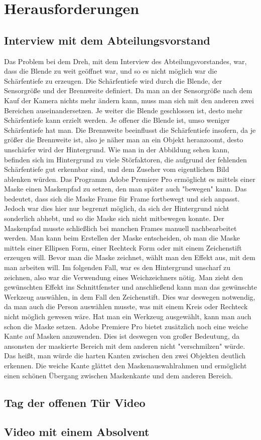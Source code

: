 \section{Herausforderungen}
\subsection{Interview mit dem Abteilungsvorstand}
Das Problem bei dem Dreh, mit dem Interview des Abteilungsvorstandes, war, dass die Blende zu weit geöffnet war, und so es nicht möglich war die Schärfentiefe zu erzeugen. Die Schärfentiefe wird durch die Blende, der Sensorgröße und der Brennweite definiert. Da man an der Sensorgröße nach dem Kauf der Kamera nichts mehr ändern kann, muss man sich mit den anderen zwei Bereichen auseinandersetzen. Je weiter die Blende geschlossen ist, desto mehr Schärfentiefe kann erzielt werden. Je offener die Blende ist, umso weniger Schärfentiefe hat man. Die Brennweite beeinflusst die Schärfentiefe insofern, da je größer die Brennweite ist, also je näher man an ein Objekt heranzoomt, desto unschärfer wird der Hintergrund. 
Wie man in der Abbildung sehen kann, befinden sich im Hintergrund zu viele Störfaktoren, die aufgrund der fehlenden Schärfentiefe gut erkennbar sind, und dem Zuseher vom eigentlichen Bild ablenken würden. 
Das Programm Adobe Premiere Pro ermöglicht es mittels einer Maske einen Maskenpfad zu setzen, den man später auch "bewegen" kann. Das bedeutet, dass sich die Maske Frame für Frame fortbewegt und sich anpasst. Jedoch war dies hier nur begrenzt möglich, da sich der Hintergrund nicht sonderlich abhebt, und so die Maske sich nicht mitbewegen konnte. Der Maskenpfad musste schließlich bei manchen Frames manuell nachbearbeitet werden.
Man kann beim Erstellen der Maske entscheiden, ob man die Maske mittels einer Ellipsen Form, einer Rechteck Form oder mit einem Zeichenstift erzeugen will. Bevor man die Maske zeichnet, wählt man den Effekt aus, mit dem man arbeiten will. Im folgenden Fall, war es den Hintergrund unscharf zu zeichnen, also war die Verwendung eines Weichzeichners nötig. Man zieht den gewünschten Effekt ins Schnittfenster und anschließend kann man das gewünschte Werkzeug auswählen, in dem Fall den Zeichenstift. Dies war deswegen notwendig, da man auch die Person auswählen musste, was mit einem Kreis oder Rechteck nicht möglich gewesen wäre. Hat man ein Werkzeug ausgewählt, kann man auch schon die Maske setzen. Adobe Premiere Pro bietet zusätzlich noch eine weiche Kante auf Masken anzuwenden. Dies ist deswegen von großer Bedeutung, da ansonsten der maskierte Bereich mit dem anderen nicht "verschmilzen" würde. Das heißt, man würde die harten Kanten zwischen den zwei Objekten deutlich erkennen. Die weiche Kante glättet den Maskenauswahlrahmen und ermöglicht einen schönen Übergang zwischen Maskenkante und dem anderen Bereich.
\subsection{Tag der offenen Tür Video}
\subsection{Video mit einem Absolvent}



